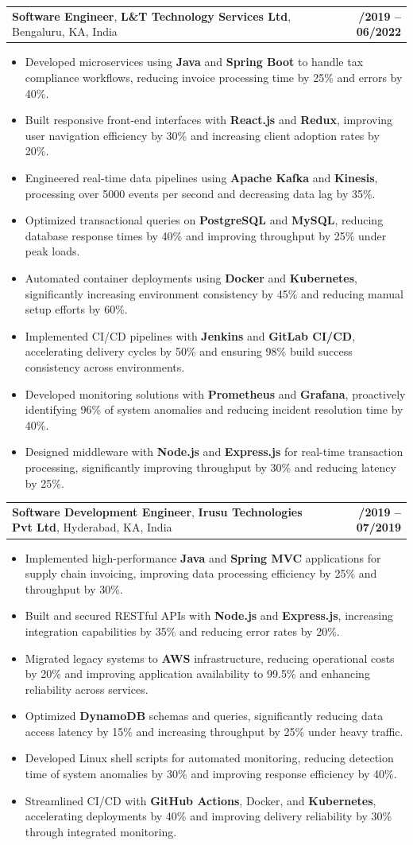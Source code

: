 \documentclass[letterpaper,11pt]{article}
\makeatletter
\newcommand{\resumeItem}[1]{
  \item\footnotesize{
    {#1 \vspace{-2pt}}
  }
}
\newcommand{\resumeSubheading}[4]{
  \vspace{-2pt}\item
    \begin{tabular*}{1.0\textwidth}[t]{l@{\extracolsep{\fill}}r}
      \textbf{\fontsize{10pt}{14pt}\selectfont #3}, \textbf{\fontsize{10pt}{14pt}\selectfont #1}, \fontsize{10pt}{14pt}\selectfont #4 & \textbf{\fontsize{10pt}{14pt}\selectfont #2} \\
    \end{tabular*}\vspace{-7pt}
}
\newcommand{\resumeItemListStart}{\begin{itemize}[leftmargin=*]}
\newcommand{\resumeItemListEnd}{\end{itemize}\vspace{-5pt}}
\makeatother
\begin{document}
    \resumeSubheading
        {L\&T Technology Services Ltd}{08/2019 -- 06/2022}
        {Software Engineer}{Bengaluru, KA, India}
      \resumeItemListStart
        \resumeItem{Developed microservices using \textbf{Java} and \textbf{Spring Boot} to handle tax compliance workflows, reducing invoice processing time by 25\% and errors by 40\%.}
        \resumeItem{Built responsive front-end interfaces with \textbf{React.js} and \textbf{Redux}, improving user navigation efficiency by 30\% and increasing client adoption rates by 20\%.}
        \resumeItem{Engineered real-time data pipelines using \textbf{Apache Kafka} and \textbf{Kinesis}, processing over 5000 events per second and decreasing data lag by 35\%.}
        \resumeItem{Optimized transactional queries on \textbf{PostgreSQL} and \textbf{MySQL}, reducing database response times by 40\% and improving throughput by 25\% under peak loads.}
        \resumeItem{Automated container deployments using \textbf{Docker} and \textbf{Kubernetes}, significantly increasing environment consistency by 45\% and reducing manual setup efforts by 60\%.}
        \resumeItem{Implemented CI/CD pipelines with \textbf{Jenkins} and \textbf{GitLab CI/CD}, accelerating delivery cycles by 50\% and ensuring 98\% build success consistency across environments.}
        \resumeItem{Developed monitoring solutions with \textbf{Prometheus} and \textbf{Grafana}, proactively identifying 96\% of system anomalies and reducing incident resolution time by 40\%.}
        \resumeItem{Designed middleware with \textbf{Node.js} and \textbf{Express.js} for real-time transaction processing, significantly improving throughput by 30\% and reducing latency by 25\%.}
      \resumeItemListEnd

    \resumeSubheading
        {Irusu Technologies Pvt Ltd}{01/2019 -- 07/2019}
        {Software Development Engineer}{Hyderabad, KA, India}
      \resumeItemListStart
        \resumeItem{Implemented high-performance \textbf{Java} and \textbf{Spring MVC} applications for supply chain invoicing, improving data processing efficiency by 25\% and throughput by 30\%.}
        \resumeItem{Built and secured RESTful APIs with \textbf{Node.js} and \textbf{Express.js}, increasing integration capabilities by 35\% and reducing error rates by 20\%.}
        \resumeItem{Migrated legacy systems to \textbf{AWS} infrastructure, reducing operational costs by 20\% and improving application availability to 99.5\% and enhancing reliability across services.}
        \resumeItem{Optimized \textbf{DynamoDB} schemas and queries, significantly reducing data access latency by 15\% and increasing throughput by 25\% under heavy traffic.}
        \resumeItem{Developed Linux shell scripts for automated monitoring, reducing detection time of system anomalies by 30\% and improving response efficiency by 40\%.}
        \resumeItem{Streamlined CI/CD with \textbf{GitHub Actions}, Docker, and \textbf{Kubernetes}, accelerating deployments by 40\% and improving delivery reliability by 30\% through integrated monitoring.}
      \resumeItemListEnd
\end{document}
